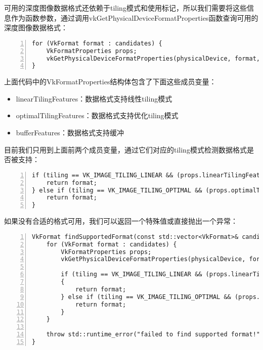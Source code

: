 \documentclass{ctexart}
\begin{document}
可用的深度图像数据格式还依赖于tiling模式和使用标记，所以我们需要将这些信息作为函数参数，通过调用vkGetPhysicalDeviceFormatProperties函数查询可用的深度图像数据格式：

\begin{lstlisting}[language={[ANSI]C},keywordstyle=\color{blue!70},commentstyle=\color{red!50!green!50!blue!50},frame=shadowbox, rulesepcolor=\color{red!20!green!20!blue!20},basicstyle=\small,numbers=left, numberstyle=\tiny,breaklines=true]
for (VkFormat format : candidates) {
	VkFormatProperties props;
	vkGetPhysicalDeviceFormatProperties(physicalDevice, format, &props);
}
\end{lstlisting}

上面代码中的VkFormatProperties结构体包含了下面这些成员变量：

\begin{itemize}
	\item linearTilingFeatures：数据格式支持线性tiling模式
	\item optimalTilingFeatures：数据格式支持优化tiling模式
	\item bufferFeatures：数据格式支持缓冲
\end{itemize}

目前我们只用到上面前两个成员变量，通过它们对应的tiling模式检测数据格式是否被支持：

\begin{lstlisting}[language={[ANSI]C},keywordstyle=\color{blue!70},commentstyle=\color{red!50!green!50!blue!50},frame=shadowbox, rulesepcolor=\color{red!20!green!20!blue!20},basicstyle=\small,numbers=left, numberstyle=\tiny,breaklines=true]
if (tiling == VK_IMAGE_TILING_LINEAR && (props.linearTilingFeatures & features) == features) {
	return format;
} else if (tiling == VK_IMAGE_TILING_OPTIMAL && (props.optimalTilingFeatures & features) == features) {
	return format;
}
\end{lstlisting}

如果没有合适的格式可用，我们可以返回一个特殊值或直接抛出一个异常：

\begin{lstlisting}[language={[ANSI]C},keywordstyle=\color{blue!70},commentstyle=\color{red!50!green!50!blue!50},frame=shadowbox, rulesepcolor=\color{red!20!green!20!blue!20},basicstyle=\small,numbers=left, numberstyle=\tiny,breaklines=true]
VkFormat findSupportedFormat(const std::vector<VkFormat>& candidates, VkImageTiling tiling, VkFormatFeatureFlags features) {
	for (VkFormat format : candidates) {
		VkFormatProperties props;
		vkGetPhysicalDeviceFormatProperties(physicalDevice, format, &props);

		if (tiling == VK_IMAGE_TILING_LINEAR && (props.linearTilingFeatures & features) == features)
		{
			return format;
		} else if (tiling == VK_IMAGE_TILING_OPTIMAL && (props.optimalTilingFeatures & features) == features) {
			return format;
		}
	}

	throw std::runtime_error("failed to find supported format!");
}
\end{lstlisting}
\end{document}
